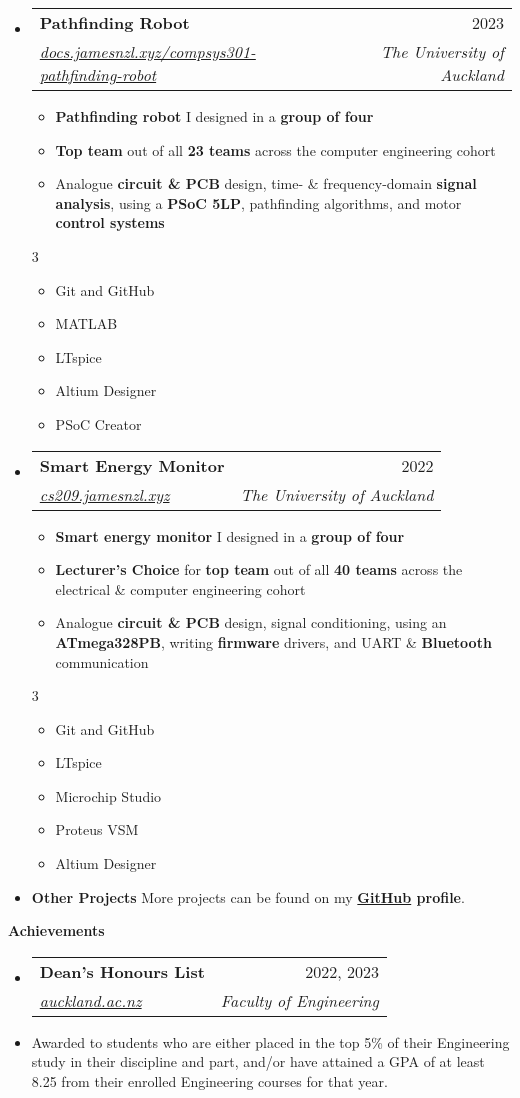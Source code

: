 \documentclass[11pt,a4paper]{article}[leftmargin=*]
\makeatletter
\def \entryspacing {-0pt}
\def \bulletstylei {\faAngleRight\hspace{-4.5pt}}
\def \bulletstyleii {\faCaretRight\hspace{-4.5pt}}
\renewcommand{\section}[2]{\vspace{5pt}
  \colorbox{secondary}{\color{white}\raggedbottom\normalsize\textbf{{#1}{\hspace{2pt}#2\hspace{4pt}}}}
}
\newcommand{\resumeEntryStart}{\begin{itemize}[leftmargin=2.5mm]}
\newcommand{\resumeEntryEnd}{\end{itemize}\vspace{\entryspacing}}
\newcommand{\resumeItemListStart}{\begin{itemize}[leftmargin=4.5mm]}
\newcommand{\resumeItemListEnd}{\end{itemize}}
\newcommand{\resumeItemListStartColumns}[2][-0.5]{\vspace*{#1\multicolsep}
\begin{multicols}{#2}\begin{itemize}[leftmargin=4.5mm]}
\newcommand{\resumeItemListEndColumns}[1][-1]{\end{itemize}\end{multicols}\vspace*{#1\multicolsep}}
\newcommand{\resumeItem}[2][\bulletstylei]{
  \item[\small#1]\small{
    {#2 \vspace{-2pt}}
  }
}
\newcommand{\resumeEntryTSDL}[4]{
  \vspace{-1pt}\item[]
    \begin{tabularx}{0.97\textwidth}{X@{\hspace{60pt}}r}
      \textbf{\color{primary}#1} & {\firabook\color{accent}\small#2} \\
      \textit{\color{accent}\small#3} & \textit{\color{accent}\small#4} \\
    \end{tabularx}\vspace{-6pt}
}
\newcommand{\resumeEntryS}[2]{
  \item[]\small{
    \textbf{\color{primary}#1 }{ #2 \vspace{-4pt}}
  }
}
\newcommand{\resumeEntryP}[1]{
  \item[]\small{
    #1 \vspace{-4pt}
  }\\
}
\newcommand{\resumeBf}[1]{\small\textbf{\color{halfbold}#1}}
\makeatother
\begin{document}
\resumeEntryStart
\resumeEntryTSDL
{Pathfinding Robot}{2023}
{\href{https://docs.jamesnzl.xyz/compsys301-pathfinding-robot}{docs.jamesnzl.xyz/compsys301-pathfinding-robot}}{The University of Auckland}
\resumeItemListStart
\resumeItem {\resumeBf{Pathfinding robot} I designed in a \resumeBf{group of four}}
\resumeItem {\resumeBf{Top team} out of all \resumeBf{23 teams} across the computer engineering cohort}
\resumeItem {Analogue \resumeBf{circuit \& PCB} design, time- \& frequency-domain \resumeBf{signal analysis}, using a \resumeBf{PSoC 5LP}, pathfinding algorithms, and motor \resumeBf{control systems}}
\resumeItemListEnd
\resumeItemListStartColumns{3}
\resumeItem[\bulletstyleii] {Git and GitHub}
\resumeItem[\bulletstyleii] {MATLAB}
\resumeItem[\bulletstyleii] {LTspice}
\resumeItem[\bulletstyleii] {Altium Designer}
\resumeItem[\bulletstyleii] {PSoC Creator}
\resumeItemListEndColumns
\resumeEntryEnd

\resumeEntryStart
\resumeEntryTSDL
{Smart Energy Monitor}{2022}
{\href{https://cs209.jamesnzl.xyz}{cs209.jamesnzl.xyz}}{The University of Auckland}
\resumeItemListStart
\resumeItem {\resumeBf{Smart energy monitor} I designed in a \resumeBf{group of four}}
\resumeItem {\resumeBf{Lecturer's Choice} for \resumeBf{top team} out of all \resumeBf{40 teams} across the electrical \& computer engineering cohort}
\resumeItem {Analogue \resumeBf{circuit \& PCB} design, signal conditioning, using an \resumeBf{ATmega328PB}, writing \resumeBf{firmware} drivers, and UART \& \resumeBf{Bluetooth} communication}
\resumeItemListEnd
\resumeItemListStartColumns{3}
\resumeItem[\bulletstyleii] {Git and GitHub}
\resumeItem[\bulletstyleii] {LTspice}
\resumeItem[\bulletstyleii] {Microchip Studio}
\resumeItem[\bulletstyleii] {Proteus VSM}
\resumeItem[\bulletstyleii] {Altium Designer}
\resumeItemListEndColumns
\resumeEntryEnd

\resumeEntryStart
\resumeEntryS
{Other Projects}{More projects can be found on my \resumeBf{\href{https://github.com/jamesnzl}{GitHub} profile}.}
\resumeEntryEnd


\section{\faTrophy}{Achievements}

\resumeEntryStart
\resumeEntryTSDL
{Dean's Honours List}{2022, 2023}
{\href{https://www.auckland.ac.nz/en/engineering/current-students/undergraduate/deans-honours-list.html}{auckland.ac.nz}}{Faculty of Engineering}
\resumeEntryP {Awarded to students who are either placed in the top 5\% of their Engineering study in their discipline and part, and/or have attained a GPA of at least 8.25 from their enrolled Engineering courses for that year.}
\resumeEntryEnd
\end{document}
